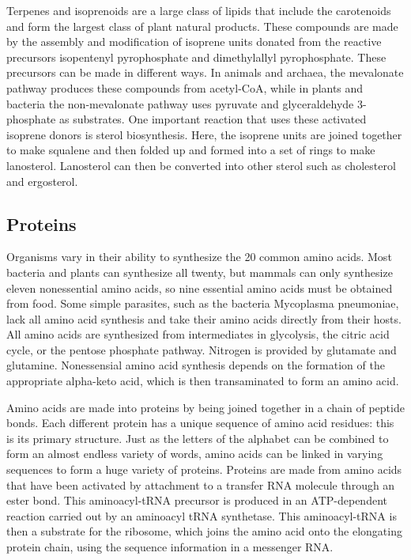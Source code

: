 Terpenes and isoprenoids are a large class of lipids that include the carotenoids and form the largest class of plant natural products. These compounds are made by the assembly and modification of isoprene units donated from the reactive precursors isopentenyl pyrophosphate and dimethylallyl pyrophosphate. These precursors can be made in different ways. In animals and archaea, the mevalonate pathway produces these compounds from acetyl-CoA, while in plants and bacteria the non-mevalonate pathway uses pyruvate and glyceraldehyde 3-phosphate as substrates. One important reaction that uses these activated isoprene donors is sterol biosynthesis. Here, the isoprene units are joined together to make squalene and then folded up and formed into a set of rings to make lanosterol. Lanosterol can then be converted into other sterol such as cholesterol and ergosterol.

\hypertarget{proteins-1}{%
\subsection{Proteins}\label{proteins-1}}

Organisms vary in their ability to synthesize the 20 common amino acids. Most bacteria and plants can synthesize all twenty, but mammals can only synthesize eleven nonessential amino acids, so nine essential amino acids must be obtained from food. Some simple parasites, such as the bacteria Mycoplasma pneumoniae, lack all amino acid synthesis and take their amino acids directly from their hosts. All amino acids are synthesized from intermediates in glycolysis, the citric acid cycle, or the pentose phosphate pathway. Nitrogen is provided by glutamate and glutamine. Nonessensial amino acid synthesis depends on the formation of the appropriate alpha-keto acid, which is then transaminated to form an amino acid.

Amino acids are made into proteins by being joined together in a chain of peptide bonds. Each different protein has a unique sequence of amino acid residues: this is its primary structure. Just as the letters of the alphabet can be combined to form an almost endless variety of words, amino acids can be linked in varying sequences to form a huge variety of proteins. Proteins are made from amino acids that have been activated by attachment to a transfer RNA molecule through an ester bond. This aminoacyl-tRNA precursor is produced in an ATP-dependent reaction carried out by an aminoacyl tRNA synthetase. This aminoacyl-tRNA is then a substrate for the ribosome, which joins the amino acid onto the elongating protein chain, using the sequence information in a messenger RNA.

